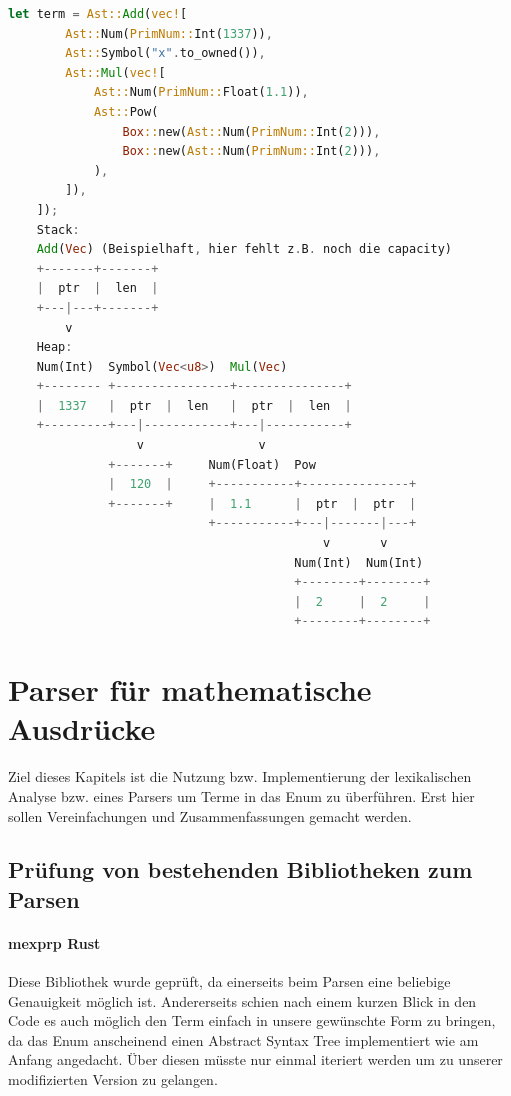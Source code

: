 \documentclass[11pt,a4paper, ngerman]{article}
\begin{document}
\begin{lstlisting}[language=rust, caption={Term 2 Stack und Heap}]
    let term = Ast::Add(vec![
        Ast::Num(PrimNum::Int(1337)),
        Ast::Symbol("x".to_owned()),
        Ast::Mul(vec![
            Ast::Num(PrimNum::Float(1.1)),
            Ast::Pow(
                Box::new(Ast::Num(PrimNum::Int(2))),
                Box::new(Ast::Num(PrimNum::Int(2))),
            ),
        ]),
    ]);
    Stack:
    Add(Vec) (Beispielhaft, hier fehlt z.B. noch die capacity)
    +-------+-------+
    |  ptr  |  len  |
    +---|---+-------+
        v
    Heap:
    Num(Int)  Symbol(Vec<u8>)  Mul(Vec)
    +-------- +----------------+---------------+
    |  1337   |  ptr  |  len   |  ptr  |  len  |
    +---------+---|------------+---|-----------+
                  v                v
              +-------+     Num(Float)  Pow
              |  120  |     +-----------+---------------+
              +-------+     |  1.1      |  ptr  |  ptr  |
                            +-----------+---|-------|---+
                                            v       v
                                        Num(Int)  Num(Int)
                                        +--------+--------+
                                        |  2     |  2     |
                                        +--------+--------+
\end{lstlisting}

\newpage

\section{Parser für mathematische Ausdrücke}
Ziel dieses Kapitels ist die Nutzung bzw. Implementierung der lexikalischen Analyse bzw. eines Parsers um Terme in das Enum  zu überführen. Erst hier sollen Vereinfachungen und Zusammenfassungen gemacht werden. 
\subsection{Prüfung von bestehenden Bibliotheken zum Parsen}
\paragraph{mexprp Rust} \cite{CrateMexprp} Diese Bibliothek wurde geprüft, da einerseits beim Parsen eine beliebige Genauigkeit möglich ist. Andererseits schien nach einem kurzen Blick in den Code es auch möglich den Term einfach in unsere gewünschte Form zu bringen, da das Enum  anscheinend einen Abstract Syntax Tree implementiert wie am Anfang angedacht. Über diesen müsste nur einmal iteriert werden um zu unserer modifizierten Version zu gelangen.
\end{document}
